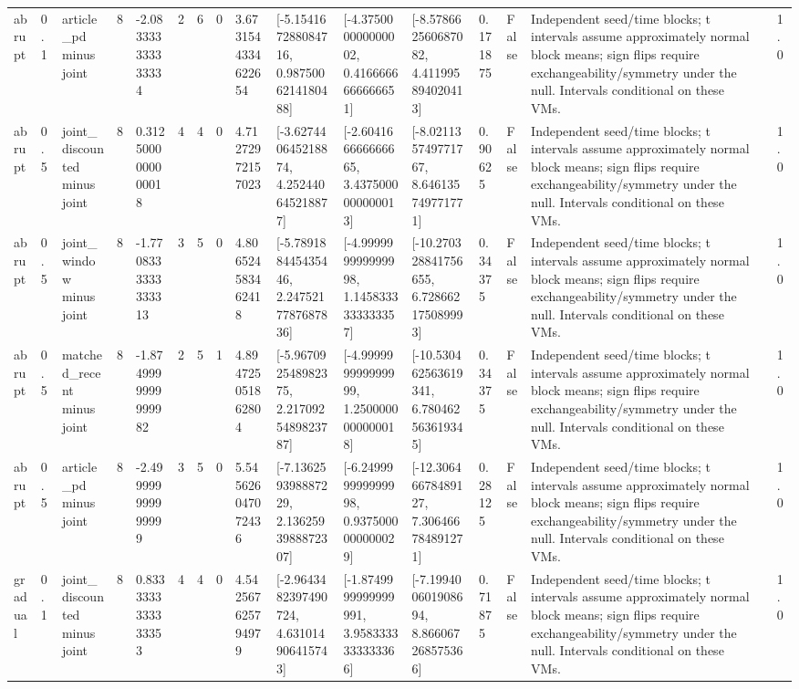 \begin{tabular}{lllllllllllllllll}
abrupt & 0.1 & article\_pd minus joint & 8 & -2.083333333333334 & 2 & 6 & 0 & 3.6731544334622654 & [-5.154167288084716, 0.9875006214180488] & [-4.375000000000002, 0.4166666666666651] & [-8.578662560687082, 4.411995894020413] & 0.171875 & False & Independent seed/time blocks; t intervals assume approximately normal block means; sign flips require exchangeability/symmetry under the null. Intervals conditional on these VMs. &  & 1.0 \\
abrupt & 0.5 & joint\_discounted minus joint & 8 & 0.3125000000000018 & 4 & 4 & 0 & 4.71272972157023 & [-3.627440645218874, 4.252440645218877] & [-2.604166666666665, 3.4375000000000013] & [-8.021135749771767, 8.646135749771771] & 0.90625 & False & Independent seed/time blocks; t intervals assume approximately normal block means; sign flips require exchangeability/symmetry under the null. Intervals conditional on these VMs. &  & 1.0 \\
abrupt & 0.5 & joint\_window minus joint & 8 & -1.7708333333333313 & 3 & 5 & 0 & 4.806524583462418 & [-5.789188445435446, 2.2475217787687836] & [-4.999999999999998, 1.1458333333333357] & [-10.270328841756655, 6.728662175089993] & 0.34375 & False & Independent seed/time blocks; t intervals assume approximately normal block means; sign flips require exchangeability/symmetry under the null. Intervals conditional on these VMs. &  & 1.0 \\
abrupt & 0.5 & matched\_recent minus joint & 8 & -1.8749999999999982 & 2 & 5 & 1 & 4.894725051862804 & [-5.967092548982375, 2.2170925489823787] & [-4.999999999999999, 1.2500000000000018] & [-10.530462563619341, 6.780462563619345] & 0.34375 & False & Independent seed/time blocks; t intervals assume approximately normal block means; sign flips require exchangeability/symmetry under the null. Intervals conditional on these VMs. &  & 1.0 \\
abrupt & 0.5 & article\_pd minus joint & 8 & -2.499999999999999 & 3 & 5 & 0 & 5.545626047072436 & [-7.136259398887229, 2.1362593988872307] & [-6.249999999999998, 0.9375000000000029] & [-12.30646678489127, 7.306466784891271] & 0.28125 & False & Independent seed/time blocks; t intervals assume approximately normal block means; sign flips require exchangeability/symmetry under the null. Intervals conditional on these VMs. &  & 1.0 \\
gradual & 0.1 & joint\_discounted minus joint & 8 & 0.8333333333333353 & 4 & 4 & 0 & 4.542567625794979 & [-2.9643482397490724, 4.631014906415743] & [-1.8749999999999991, 3.9583333333333366] & [-7.199400601908694, 8.866067268575366] & 0.71875 & False & Independent seed/time blocks; t intervals assume approximately normal block means; sign flips require exchangeability/symmetry under the null. Intervals conditional on these VMs. &  & 1.0 \\

\end{tabular}
